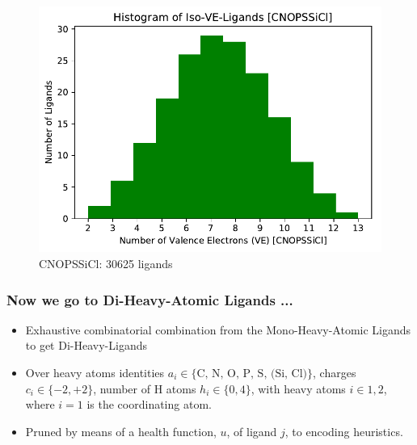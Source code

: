 \documentclass{beamer}
\begin{document}
\begin{frame}
\begin{figure}[ht]
\begin{minipage}[b]{0.5\linewidth}
		\centering
		\includegraphics[width=.5\linewidth]{img/hist_isove_ligands_CNOPSSiCl.pdf} 
		\caption{CNOPSSiCl: 30625 ligands} 
		\vspace{4ex}
	\end{minipage} 
\end{figure}
\end{frame}


\begin{frame}
\frametitle{Now we go to Di-Heavy-Atomic Ligands ...}
\begin{itemize}
	\item Exhaustive combinatorial combination from the Mono-Heavy-Atomic Ligands to get Di-Heavy-Ligands
	\item Over heavy atoms identities $a_i \in \textrm{\{C,~N,~O,~P,~S,~(Si,~Cl)\}}$, charges $c_i \in \{-2, +2\}$, number of H atoms $h_i \in \{0, 4\}$, with heavy atoms $i \in {1,2}$, where $i=1$ is the coordinating atom.
	\item Pruned by means of a health function, $u$, of ligand $j$, to encoding heuristics.
\end{itemize}
\end{frame}

\end{document}
